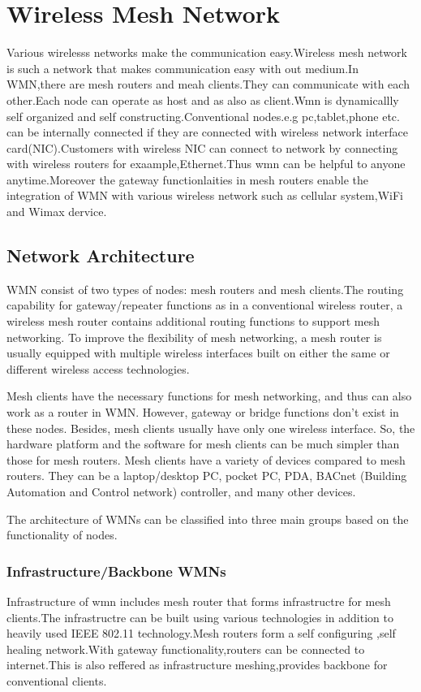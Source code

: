 \documentclass[12pt,a4paper]{report}
\begin{document}
\section{Wireless Mesh Network}
Various wirelesss networks make the communication easy.Wireless mesh network is  such a network that makes communication easy with out medium.In WMN,there are mesh routers and meah clients.They can communicate with each other.Each node can operate as host and as also as client.Wmn is dynamicallly self organized and self constructing.Conventional nodes.e.g pc,tablet,phone etc. can be internally connected if they are connected with wireless network interface card(NIC).Customers with wireless NIC can connect to network by connecting with wireless routers for exaample,Ethernet.Thus wmn can be helpful to anyone anytime.Moreover the gateway functionlaities in mesh routers enable the integration of WMN with various wireless network such as cellular system,WiFi and Wimax dervice.



\subsection{Network Architecture}
WMN consist of two types of nodes: mesh routers and mesh clients.The routing
capability for gateway/repeater functions as in a conventional wireless router, a wireless mesh
router contains additional routing functions to support mesh networking. To improve
the flexibility of mesh networking, a mesh router is usually equipped with multiple wireless
interfaces built on either the same or different wireless access technologies.

Mesh clients have the necessary functions for mesh networking, and thus can also
work as a router in WMN. However, gateway or bridge functions don't exist in these nodes.
Besides, mesh clients usually have only one wireless interface. So, the
hardware platform and the software for mesh clients can be much simpler than those for mesh
routers. Mesh clients have a variety of devices compared to mesh routers. They can be
a laptop/desktop PC, pocket PC, PDA, BACnet (Building Automation
and Control network) controller, and many other devices.

The architecture of WMNs can be classified into three main groups based on the
functionality of  nodes.


\subsubsection{Infrastructure/Backbone WMNs}
Infrastructure of wmn includes mesh router that forms infrastructre for mesh clients.The infrastructre can be built using various technologies in addition to heavily used IEEE 802.11 technology.Mesh routers form a self configuring ,self healing network.With gateway functionality,routers can be connected to internet.This is also reffered as infrastructure meshing,provides backbone for conventional clients.
\end{document}
